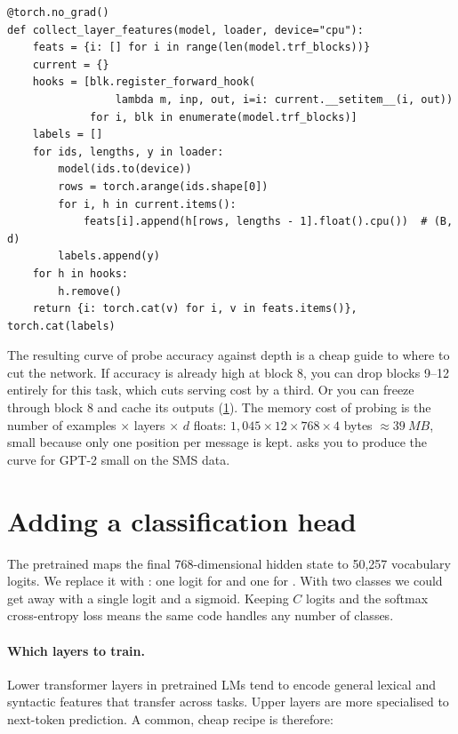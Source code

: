 \begin{lstlisting}[caption={Collecting per-layer last-token features with forward hooks.},label={lst:classify:probe}]
@torch.no_grad()
def collect_layer_features(model, loader, device="cpu"):
    feats = {i: [] for i in range(len(model.trf_blocks))}
    current = {}
    hooks = [blk.register_forward_hook(
                 lambda m, inp, out, i=i: current.__setitem__(i, out))
             for i, blk in enumerate(model.trf_blocks)]
    labels = []
    for ids, lengths, y in loader:
        model(ids.to(device))
        rows = torch.arange(ids.shape[0])
        for i, h in current.items():
            feats[i].append(h[rows, lengths - 1].float().cpu())  # (B, d)
        labels.append(y)
    for h in hooks:
        h.remove()
    return {i: torch.cat(v) for i, v in feats.items()}, torch.cat(labels)
\end{lstlisting}

The resulting curve of probe accuracy against depth is a cheap guide to where to cut the
network. If accuracy is already high at block 8, you can drop blocks 9--12 entirely for
this task, which cuts serving cost by a third. Or you can freeze through block 8 and
cache its outputs (\cref{sec:classify:head}). The memory cost of probing is the number
of examples $\times$ layers $\times$ $d$ floats: $1{,}045\times12\times768\times4$
bytes $\approx\SI{39}{MB}$, small because only one position per message is kept.
 asks you to produce the curve for GPT-2 small on the SMS data.

\section{Adding a classification head}\label{sec:classify:head}

The pretrained  maps the final 768-dimensional hidden state to 50{,}257
vocabulary logits. We replace it with : one logit for 
and one for . With two classes we could get away with a single logit and a
sigmoid. Keeping $C$ logits and the softmax cross-entropy loss means the same code
handles any number of classes.

\paragraph{Which layers to train.} Lower transformer layers in pretrained LMs tend to
encode general lexical and syntactic features that transfer across tasks. Upper layers
are more specialised to next-token prediction. A common, cheap recipe is therefore:

